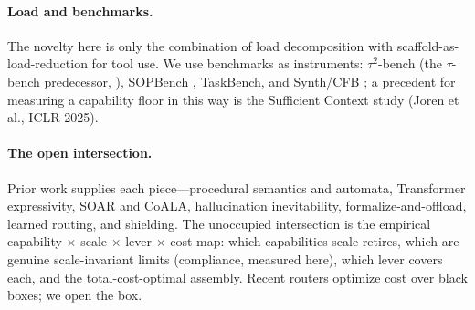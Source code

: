 \documentclass[10pt]{article}
\begin{document}
\paragraph{Load and benchmarks.} The novelty here is only the combination of load decomposition with scaffold-as-load-reduction for tool use. We use benchmarks as instruments: $\tau^2$-bench \citep{ax2506_07982} (the $\tau$-bench predecessor, \citealp{ax2406_12045}), SOPBench \citep{ax2503_08669}, TaskBench, and Synth/CFB \citep{ax2501_10132}; a precedent for measuring a capability floor in this way is the Sufficient Context study (Joren et al., ICLR 2025).

\paragraph{The open intersection.} Prior work supplies each piece---procedural semantics and automata, Transformer expressivity, SOAR and CoALA, hallucination inevitability, formalize-and-offload, learned routing, and shielding. The unoccupied intersection is the empirical capability $\times$ scale $\times$ lever $\times$ cost map: which capabilities scale retires, which are genuine scale-invariant limits (compliance, measured here), which lever covers each, and the total-cost-optimal assembly. Recent routers optimize cost over black boxes; we open the box.
\end{document}
